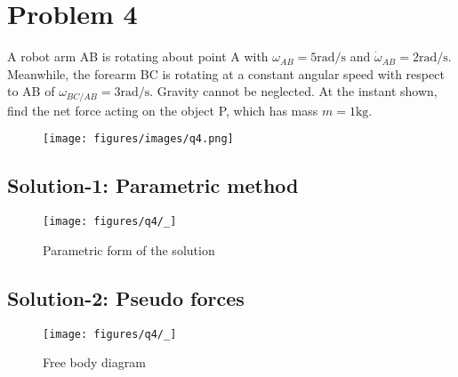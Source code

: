 \section*{Problem 4}

A robot arm AB is rotating about point A with \( \omega_{AB} = 5 \text{rad/s} \) and \( \dot\omega_{AB} = 2 \text{rad/s} \).
Meanwhile, the forearm BC is rotating at a constant angular speed with respect to AB of \( \omega_{BC/AB} = 3 \text{rad/s} \).
Gravity cannot be neglected.
At the instant shown, find the net force acting on the object P, which has mass \( m = 1\text{kg} \).

\begin{figure*}[h]
    \centering
    \texttt{[image: figures/images/q4.png]}
\end{figure*}

\subsection*{Solution-1: Parametric method}

\begin{figure*}[htb]
    \centering
    \texttt{[image: figures/q4/\_]}
    \caption{
        Parametric form of the solution
    }
\end{figure*}

\subsection*{Solution-2: Pseudo forces}

\begin{figure*}[htb]
    \centering
    \texttt{[image: figures/q4/\_]}
    \caption{
        Free body diagram
    }
\end{figure*}
